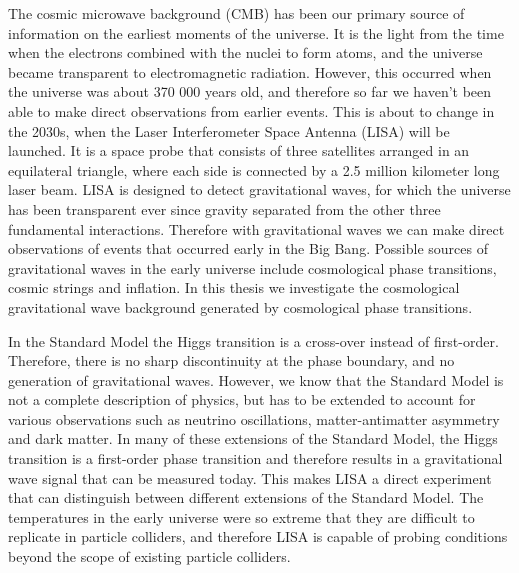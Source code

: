 \iffalse
Raise the interest of the reader!

Tip for style: discuss the same things from another point of view (in the light of the results) in the conclusion.
-> Binds the thesis together.

\begin{itemize}
    \item Background for the choice of theme
    \item A discussion of the research question or thesis statement
    \item A schematic outline of the thesis
\end{itemize}

Research question: how to simulate the gravitational spectra caused by different equations of state with PTtools?
\fi

The cosmic microwave background (CMB) has been our primary source of information on the earliest moments of the universe.
It is the light from the time when the electrons combined with the nuclei to form atoms,
and the universe became transparent to electromagnetic radiation.
However, this occurred when the universe was about 370 000 years old,
and therefore so far we haven't been able to make direct observations from earlier events.
This is about to change in the 2030s, when the Laser Interferometer Space Antenna (LISA) will be launched.
It is a space probe that consists of three satellites arranged in an equilateral triangle, where each side is connected by a 2.5 million kilometer long laser beam.
LISA is designed to detect gravitational waves,
for which the universe has been transparent ever since gravity separated from the other three fundamental interactions.
Therefore with gravitational waves we can make direct observations of events that occurred early in the Big Bang.
Possible sources of gravitational waves in the early universe include cosmological phase transitions, cosmic strings and inflation.
In this thesis we investigate the cosmological gravitational wave background generated by cosmological phase transitions.
\cite{lecture_notes}

In the Standard Model the Higgs transition is a cross-over instead of first-order.
Therefore, there is no sharp discontinuity at the phase boundary, and no generation of gravitational waves.
However, we know that the Standard Model is not a complete description of physics,
but has to be extended to account for various observations such as neutrino oscillations, matter-antimatter asymmetry and dark matter.
In many of these extensions of the Standard Model, the Higgs transition is a first-order phase transition
and therefore results in a gravitational wave signal that can be measured today.
This makes LISA a direct experiment that can distinguish between different extensions of the Standard Model.
The temperatures in the early universe were so extreme that they are difficult to replicate in particle colliders,
and therefore LISA is capable of probing conditions beyond the scope of existing particle colliders.
\cite{lecture_notes}


